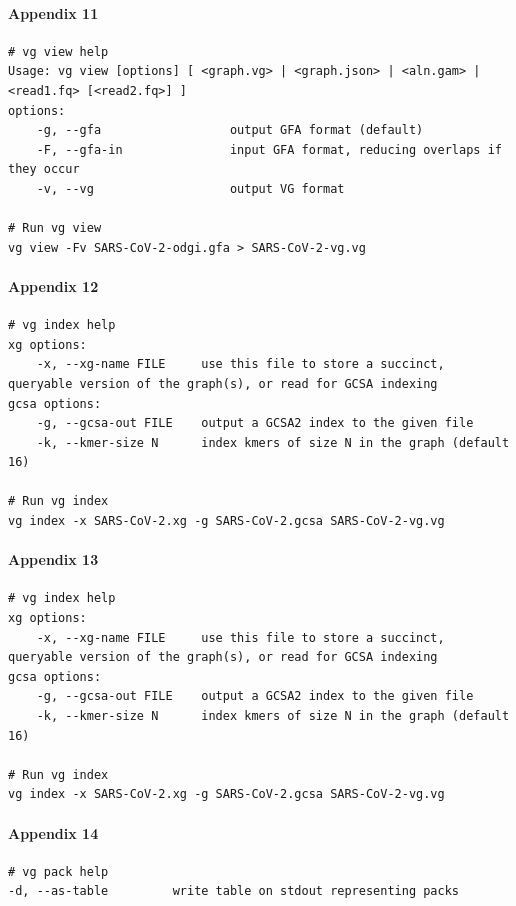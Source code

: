 \documentclass[10pt, a4paper]{article}
\begin{document}
\begin{appendices}
\paragraph{Appendix 11}
\label{sec:orgf7c6509}
\begin{verbatim}
# vg view help
Usage: vg view [options] [ <graph.vg> | <graph.json> | <aln.gam> | <read1.fq> [<read2.fq>] ]
options:
    -g, --gfa                  output GFA format (default)
    -F, --gfa-in               input GFA format, reducing overlaps if they occur
    -v, --vg                   output VG format

# Run vg view
vg view -Fv SARS-CoV-2-odgi.gfa > SARS-CoV-2-vg.vg

\end{verbatim}


\paragraph{Appendix 12}
\label{sec:orga09ca57}
\begin{verbatim}
# vg index help
xg options:
    -x, --xg-name FILE     use this file to store a succinct, queryable version of the graph(s), or read for GCSA indexing
gcsa options:
    -g, --gcsa-out FILE    output a GCSA2 index to the given file
    -k, --kmer-size N      index kmers of size N in the graph (default 16)

# Run vg index
vg index -x SARS-CoV-2.xg -g SARS-CoV-2.gcsa SARS-CoV-2-vg.vg

\end{verbatim}

\paragraph{Appendix 13}
\label{sec:org68d1af3}
\begin{verbatim}
# vg index help
xg options:
    -x, --xg-name FILE     use this file to store a succinct, queryable version of the graph(s), or read for GCSA indexing
gcsa options:
    -g, --gcsa-out FILE    output a GCSA2 index to the given file
    -k, --kmer-size N      index kmers of size N in the graph (default 16)

# Run vg index
vg index -x SARS-CoV-2.xg -g SARS-CoV-2.gcsa SARS-CoV-2-vg.vg
\end{verbatim}

\paragraph{Appendix 14}
\label{sec:orge337de4}
\begin{verbatim}
# vg pack help
-d, --as-table         write table on stdout representing packs


\end{verbatim}
\end{appendices}
\end{document}
